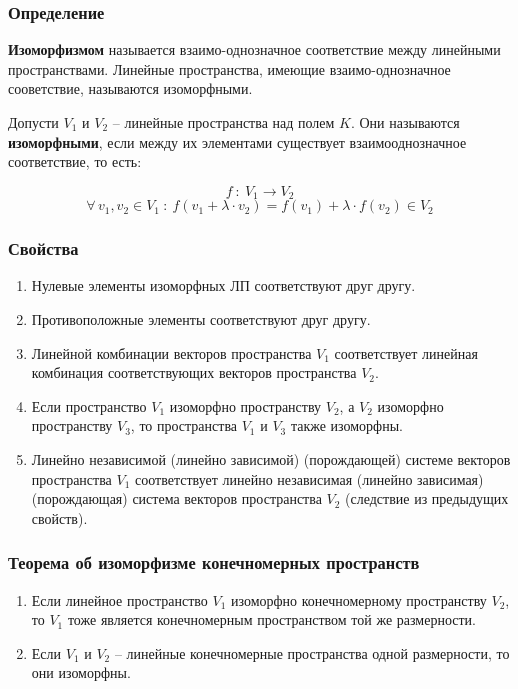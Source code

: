 \documentclass{article}
\begin{document}
\subsubsection{Определение}
\textbf{Изоморфизмом} называется взаимо-однозначное соответствие между линейными пространствами. Линейные пространства, имеющие взаимо-однозначное сооветствие, называются изоморфными.

Допусти $V_1$ и $V_2$ -- линейные пространства над полем $K$. Они называются \textbf{изоморфными}, если между их элементами существует взаимооднозначное соответствие, то есть:

$$ f\::\:V_1\to V_2 $$
$$ \forall\,v_1,v_2\in V_1\::\:f(v_1+\lambda\cdot v_2)=f(v_1)+\lambda\cdot f(v_2) \in V_2$$

\subsubsection{Свойства}
\begin{enumerate}
    \item Нулевые элементы изоморфных ЛП соответствуют друг другу.
    \item Противоположные элементы соответствуют друг другу.
    \item Линейной комбинации векторов пространства $V_1$ соответствует линейная комбинация соответствующих векторов пространства $V_2$.
    \item Если пространство $V_1$ изоморфно пространству $V_2$, а $V_2$ изоморфно пространству $V_3$, то пространства $V_1$ и $V_3$ также изоморфны.
    \item Линейно независимой (линейно зависимой) (порождающей) системе векторов пространства $V_1$ соответствует линейно независимая (линейно зависимая) (порождающая) система векторов пространства $V_2$ (следствие из предыдущих свойств).
\end{enumerate}
\subsubsection{Теорема об изоморфизме конечномерных пространств}
\begin{enumerate}
    \item Если линейное пространство $V_1$ изоморфно конечномерному пространству $V_2$, то $V_1$ тоже является конечномерным пространством той же размерности.
    \item Если $V_1$ и $V_2$ -- линейные конечномерные пространства одной размерности, то они изоморфны.
\end{enumerate}
\end{document}
